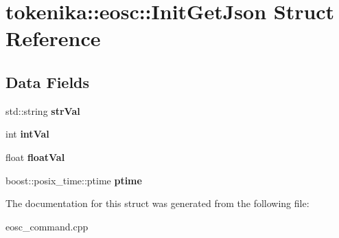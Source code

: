 \hypertarget{structtokenika_1_1eosc_1_1_init_get_json}{}\section{tokenika\+:\+:eosc\+:\+:Init\+Get\+Json Struct Reference}
\label{structtokenika_1_1eosc_1_1_init_get_json}
\subsection*{Data Fields}
\begin{DoxyCompactItemize}
\item 
\mbox{\label{structtokenika_1_1eosc_1_1_init_get_json_a19564069824531cdead743209c1092e3}} 
std\+::string {\bfseries str\+Val}
\item 
\mbox{\label{structtokenika_1_1eosc_1_1_init_get_json_a39b17a82f0b5c2346756683665594a39}} 
int {\bfseries int\+Val}
\item 
\mbox{\label{structtokenika_1_1eosc_1_1_init_get_json_a2bd646a37a513d5a49e2e8a6bcfa6c43}} 
float {\bfseries float\+Val}
\item 
\mbox{\label{structtokenika_1_1eosc_1_1_init_get_json_ad7763c3fb45c04c17c292e00220e4ef9}} 
boost\+::posix\+\_\+time\+::ptime {\bfseries ptime}
\end{DoxyCompactItemize}


The documentation for this struct was generated from the following file\+:\begin{DoxyCompactItemize}
\item 
eosc\+\_\+command.\+cpp\end{DoxyCompactItemize}
